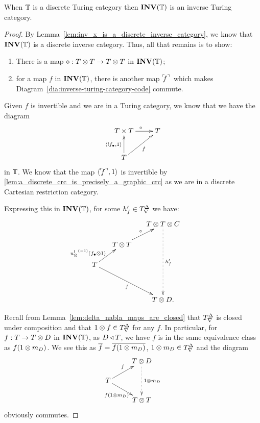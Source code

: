 \begin{lemma}\label{lem:discrete_turing_category_inverses_make_inverse_turing_category}
  When $\mathbb{T}$ is a discrete Turing category then $\mathbf{INV}({\mathbb{T}})$ is an inverse Turing category.
\end{lemma}
\begin{proof}
  By Lemma~\ref{lem:inv_x_is_a_discrete_inverse_category}, we know that $\mathbf{INV}({\mathbb{T}})$ is a discrete
  inverse category. Thus, all that remains is to show:
  \begin{enumerate}[{(}i{)}]
    \item There is a map $\diamond:T\otimes T \to T\otimes T$ in $\mathbf{INV}({\mathbb{T}})$;
    \item for a  map $f$ in $\mathbf{INV}({\mathbb{T}})$, there is another map ${}^\ulcorner\!\!f^\urcorner$ which makes
      Diagram~\ref{dia:inverse-turing-category-code} commute.
  \end{enumerate}

  Given $f$ is invertible and we are in a Turing category, we know that we have the diagram
      \[
        \xymatrix{
          T\times T \ar[r]^{\circ} & T \\
          T \ar[ur]_{f} \ar[u]^{\<!\code{f},1\>}
        }
      \]
  in $\mathbb{T}$.   We know that the  map $\langle{}^\ulcorner\!\!f^\urcorner,1\rangle$ is invertible by
  \ref{lem:a_discrete_crc_is_precisely_a_graphic_crc} as we are in a discrete Cartesian restriction
  category.

  Expressing this in $\mathbf{INV}({\mathbb{T}})$, for some $h'_f \in {T}^{\Delta}_{\nabla}$ we have:
  \begin{equation}
    \xymatrix @C=15pt @R=15pt{
      & & T \* T\*C \ar@{.>}[dddd]^{h'_f}\\
      &T\*T \ar[ur]^{\circ} & & \\
      T \ar[ur]^(.3){\inv{\usl}(\code{f}\*1)} \ar[ddrr]_{f} \\
      & & & \\
      && T\*D.
    }\label{dia:pre-inverse-turing}
  \end{equation}

  Recall from Lemma~\ref{lem:delta_nabla_maps_are_closed} that ${T}^{\Delta}_{\nabla}$ is closed under
  composition and that $1\otimes f\in {T}^{\Delta}_{\nabla}$ for any $f$. In particular, for $f:T\to T\otimes D$ in
  $\mathbf{INV}({\mathbb{T}})$, as $D\triangleleft T$, we have $f$ is in the same equivalence class as $f(1\otimes m_D)$. We see
  this as $\overline{f} = \overline{f(1\otimes m_D)}$, $1\otimes m_D\in {T}^{\Delta}_{\nabla}$ and the diagram
  \[
    \xymatrix@R-10pt{
      &T\*D \ar@{.>}[dd]^{1\*m_D}\\
      T \ar[ur]^{f} \ar[dr]_{f(1\*m_D)}& \\
      &T\*T
    }
  \]
  obviously commutes.


\end{proof}
